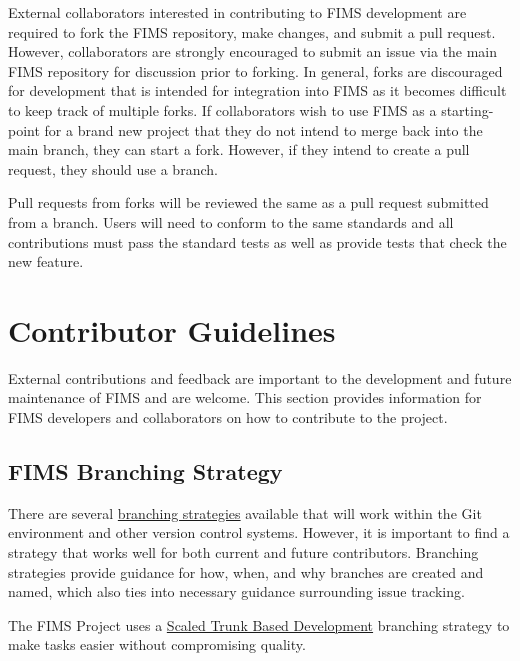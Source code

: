 \documentclass[
]{book}
\begin{document}
External collaborators interested in contributing to FIMS development are required to fork the FIMS repository, make changes, and submit a pull request. However, collaborators are strongly encouraged to submit an issue via the main FIMS repository for discussion prior to forking. In general, forks are discouraged for development that is intended for integration into FIMS as it becomes difficult to keep track of multiple forks. If collaborators wish to use FIMS as a starting-point for a brand new project that they do not intend to merge back into the main branch, they can start a fork. However, if they intend to create a pull request, they should use a branch.

Pull requests from forks will be reviewed the same as a pull request submitted from a branch. Users will need to conform to the same standards and all contributions must pass the standard tests as well as provide tests that check the new feature.

\hypertarget{contributor-guidelines}{%
\chapter{Contributor Guidelines}\label{contributor-guidelines}}

External contributions and feedback are important to the development and future maintenance of FIMS and are welcome. This section provides information for FIMS developers and collaborators on how to contribute to the project.

\hypertarget{fims-branching-strategy}{%
\section{FIMS Branching Strategy}\label{fims-branching-strategy}}

There are several \href{https://reviewpad.com/blog/github-flow-trunk-based-development-and-code-reviews/}{branching strategies} available that will work within the Git environment and other version control systems. However, it is important to find a strategy that works well for both current and future contributors. Branching strategies provide guidance for how, when, and why branches are created and named, which also ties into necessary guidance surrounding issue tracking.

The FIMS Project uses a \href{https://trunkbaseddevelopment.com/}{Scaled Trunk Based Development} branching strategy to make tasks easier without compromising quality.
\end{document}

